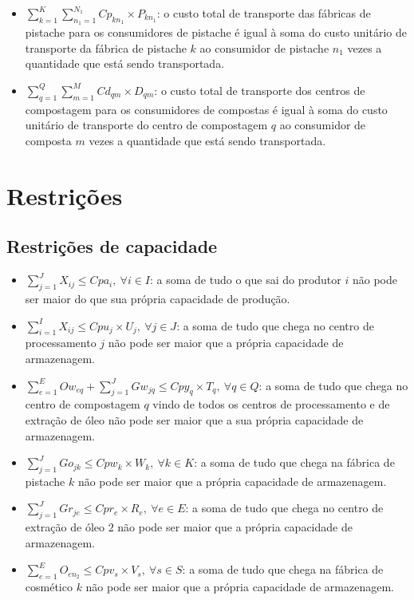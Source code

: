\documentclass[]{article}
\begin{document}
\begin{itemize}
				\item $\sum\limits_{k=1}^K\sum\limits_{n_1=1}^{N_1} Cp_{kn_1}\times P_{kn_1}$: o custo total de transporte das fábricas de pistache para os consumidores de pistache é igual à soma do custo unitário de transporte da fábrica de pistache $k$ ao consumidor de pistache $n_1$ vezes a quantidade que está sendo transportada.
				\item $\sum\limits_{q=1}^Q\sum\limits_{m=1}^M Cd_{qm}\times D_{qm}$: o custo total de transporte dos centros de compostagem para os consumidores de compostas é igual à soma do custo unitário de transporte do centro de compostagem $q$ ao consumidor de composta $m$ vezes a quantidade que está sendo transportada.
			\end{itemize}

	\section{Restrições}
	
		\subsection{Restrições de capacidade}
		
			\begin{itemize}
				\item $\sum\limits_{j=1}^J X_{ij} \le Cpa_i,~\forall i \in I$: a soma de tudo o que sai do produtor $i$ não pode ser maior do que sua própria capacidade de produção.
				\item $\sum\limits_{i=1}^I X_{ij} \le Cpu_j\times U_j,~\forall j \in J$: a soma de tudo que chega no centro de processamento $j$ não pode ser maior que a própria capacidade de armazenagem.
				\item $\sum\limits_{e=1}^E Ow_{eq} + \sum\limits_{j=1}^J Gw_{jq} \le Cpy_q \times T_q,~\forall q\in Q$: a soma de tudo que chega no centro de compostagem $q$ vindo de todos os centros de processamento e de extração de óleo não pode ser maior que a sua própria capacidade de armazenagem.
				\item $\sum\limits_{j=1}^J Go_{jk} \le Cpw_k\times W_k,~\forall k \in K$: a soma de tudo que chega na fábrica de pistache $k$ não pode ser maior que a própria capacidade de armazenagem.
				\item $\sum\limits_{j=1}^J Gr_{je} \le Cpr_e\times R_e,~\forall e \in E$: a soma de tudo que chega no centro de extração de óleo $2$ não pode ser maior que a própria capacidade de armazenagem.
				\item $\sum\limits_{e=1}^E O_{en_2} \le Cpv_s\times V_s,~\forall s \in S$: a soma de tudo que chega na fábrica de cosmético $k$ não pode ser maior que a própria capacidade de armazenagem.
			\end{itemize}
\end{document}
